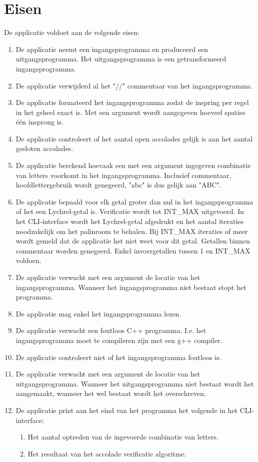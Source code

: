 \documentclass[10pt]{article}
\begin{document}
\section{Eisen}
\label{sec:eisen}
De applicatie voldoet aan de volgende eisen:
\begin{enumerate}
      \item De applicatie neemt een ingangsprogramma en produceerd een uitgangsprogramma. Het uitgangsprogramma is een
            getransformeerd ingangsprogramma.
      \item De applicatie verwijderd al het "//" commentaar van het ingangsprogramma.
      \item De applicatie formateerd het ingangsprogramma zodat de inspring per regel in het geheel exact is. Met een
            argument wordt aangegeven hoeveel spaties \'e\'en insprong is.
      \item De applicatie controleert of het aantal open accolades gelijk is aan het aantal gesloten accolades.
      \item De applicatie berekend hoevaak een met een argument ingegeven combinatie van letters voorkomt in het
            ingangsprogramma. Inclusief commentaar, hoofdlettergebruik wordt genegeerd, "abc" is dus gelijk aan
            "ABC".
      \item De applicatie bepaald voor elk getal groter dan nul in het ingangsprogramma of het een Lychrel-getal is.
            Verificatie
            wordt tot INT\_MAX uitgevoerd. In het CLI-interface wordt het Lychrel-getal afgedrukt en het aantal
            iteraties
            noodzakelijk om het palinroom te behalen. Bij INT\_MAX iteraties of meer wordt gemeld dat de applicatie het
            niet weet voor dit
            getal. Getallen binnen commentaar worden genegeerd. Enkel invoergetallen tussen 1 en INT\_MAX voldoen.
      \item De applicatie verwacht met een argument de locatie van het ingangsprogramma. Wanneer het ingangsprogramma
            niet bestaat stopt het programma.
      \item De applicatie mag enkel het ingangsprogramma lezen.
      \item De applicatie verwacht een foutloos C++ programma. I.e. het ingangsprogramma moet te compileren zijn met
            een
            g++ compiler.
      \item De applicatie controleert niet of het ingangsprogramma foutloos is.
      \item De applicatie verwacht met een argument de locatie van het uitgangsprogramma. Wanneer het uitgangsprogramma
            niet bestaat wordt het aangemaakt, wanneer het wel bestaat wordt het overschreven.
      \item De applicatie print aan het eind van het programma het volgende in het CLI-interface:
            \begin{enumerate}
                  \item Het aantal optreden van de ingevoerde combinatie van letters.
                  \item Het resultaat van het accolade verificatie algoritme.
            \end{enumerate}
\end{enumerate}
\end{document}
